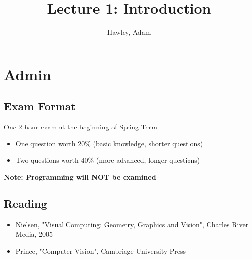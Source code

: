 \documentclass{article}
\author{Hawley, Adam}
\title{Lecture 1: Introduction}
\begin{document}
\maketitle{}
\section{Admin}
\subsection{Exam Format}
One 2 hour exam at the beginning of Spring Term.
\begin{itemize}
\item One question worth 20\% (basic knowledge, shorter questions)
\item Two questions worth 40\% (more advanced, longer questions)
\end{itemize}
{\bf Note: Programming will NOT be examined}
\subsection{Reading}
\begin{itemize}
	\item Nielsen, "Visual Computing: Geometry, Graphics and Vision", Charles River Media, 2005
	\item Prince, "Computer Vision", Cambridge University Press
\end{itemize}
\end{document}
